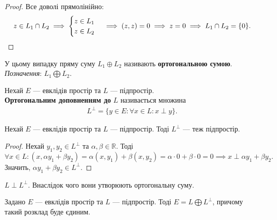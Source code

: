 \documentclass{math_library}
\begin{document}
\begin{proof}
Все доволі прямолінійно:
\[
z \in L_1 \cap L_2 \implies \begin{cases} z \in L_1 \\ z \in L_2 \end{cases} \implies (z,z) = 0 \implies z = 0 \implies L_1 \cap L_2 = \{0\}. \qedhere
\]
\end{proof}
\noindent
У цьому випадку пряму суму $L_1  \oplus  L_2$ називають \textbf{ортогональною сумою}.\\
\textit{Позначення}: $L_1 \bigoplus L_2$.

\begin{definition}
Нехай $E$ --- евклідів простір та $L$ --- підпростір.\\
\textbf{Ортогональним доповненням до} $L$ називається множина
\begin{align*}
L^{\perp} = \{y \in E: \forall x \in L: x \perp y\}.
\end{align*}
\end{definition}

\begin{proposition}
Нехай $E$ --- евклідів простір та $L$ --- підпростір. Тоді $L^{\perp}$ --- теж підпростір.
\end{proposition}

\begin{proof}
Нехай $y_1,y_2 \in L^{\perp}$ та $\alpha,\beta \in \mathbb{R}$. Тоді
\[
\forall x \in L: (x, \alpha y_1+ \beta y_2) = \alpha (x,y_1) + \beta (x,y_2) = \alpha \cdot 0 + \beta \cdot 0 = 0 \implies x \perp \alpha y_1 + \beta y_2.
\]
Значить, $\alpha y_1 + \beta y_2 \in L^{\perp}$.
\end{proof}

\begin{corollary}
$L \perp L^\perp$. Внаслідок чого вони утворюють ортогональну суму.
\end{corollary}

\begin{theorem}
Задано $E$ --- евклідів простір та $L$ --- підпростір. Тоді $E = L \bigoplus L^{\perp}$, причому такий розклад буде єдиним.
\end{theorem}
\end{document}
